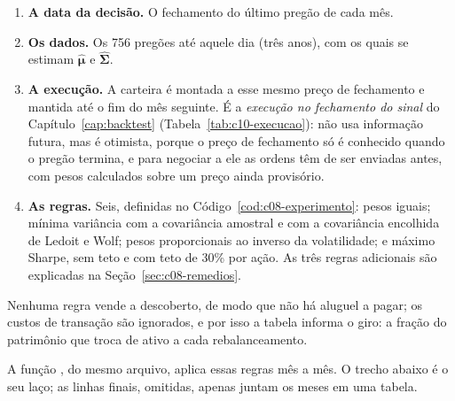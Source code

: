 \begin{enumerate}
  \item \textbf{A data da decisão.} O fechamento do último pregão de cada mês.
  \item \textbf{Os dados.} Os 756 pregões até aquele dia (três anos), com os quais se estimam $\hat{\symbf{\mu}}$ e $\hat{\symbf{\Sigma}}$.
  \item \textbf{A execução.} A carteira é montada a esse mesmo preço de fechamento e mantida até o fim do mês seguinte. É a \emph{execução no fechamento do sinal} do Capítulo~\ref{cap:backtest} (Tabela~\ref{tab:c10-execucao}): não usa informação futura, mas é otimista, porque o preço de fechamento só é conhecido quando o pregão termina, e para negociar a ele as ordens têm de ser enviadas antes, com pesos calculados sobre um preço ainda provisório.
  \item \textbf{As regras.} Seis, definidas no Código~\ref{cod:c08-experimento}: pesos iguais; mínima variância com a covariância amostral e com a covariância encolhida de Ledoit e Wolf; pesos proporcionais ao inverso da volatilidade; e máximo Sharpe, sem teto e com teto de 30\% por ação. As três regras adicionais são explicadas na Seção~\ref{sec:c08-remedios}.
\end{enumerate}

Nenhuma regra vende a descoberto, de modo que não há aluguel a pagar; os custos de transação são ignorados, e por isso a tabela informa o giro: a fração do patrimônio que troca de ativo a cada rebalanceamento.



A função , do mesmo arquivo, aplica essas regras mês a mês. O trecho abaixo é o seu laço; as linhas finais, omitidas, apenas juntam os meses em uma tabela.



